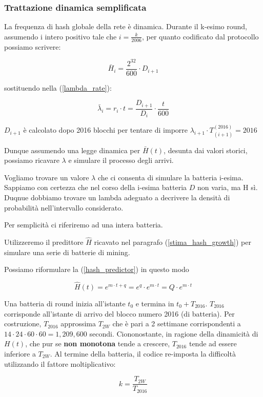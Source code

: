 \documentclass{book}
\theoremstyle{definition}
\begin{document}
\subsubsection{Trattazione dinamica semplificata}

La frequenza di hash globale della rete è dinamica.
Durante il k-esimo round, assumendo i intero positivo tale che $i = \frac{k}{2006}$, per quanto codificato dal protocollo possiamo scrivere:

$$
    \bar{H}_{i} = \frac{2^{32}}{600} \cdot D_{i+1}
$$

sostituendo nella (\ref{lambda_rate}):

$$
\bar{\lambda}_{i} = r_{i} \cdot t = \frac{D_{i+1}}{D_{i}} \cdot \frac{t}{600}
$$

$D_{i+1}$ è calcolato dopo 2016 blocchi per tentare di imporre $\lambda_{i+1} \cdot T_{(i+1)}^{(2016)}  = 2016$ 

Dunque assumendo una legge dinamica per $\bar{H}(t)$, desunta dai valori storici, possiamo ricavare $\lambda$ e simulare il processo degli arrivi.

Vogliamo trovare un valore $\lambda$ che ci consenta di simulare la batteria i-esima. Sappiamo con certezza che nel corso della i-esima batteria $D$ non varia, ma H sì. Duqnue dobbiamo trovare un lambda adeguato a decrivere la densità di probabilità nell'intervallo considerato.

Per semplicità ci riferiremo ad una intera batteria.

Utilizzeremo il predittore $\hat{H}$ ricavato nel paragrafo (\ref{stima_hash_growth}) per simulare una serie di batterie di mining.

Possiamo riformulare la (\ref{hash_predictor}) in questo modo

$$
	\hat{H}(t) = e^{m \cdot t + q} = e^{q} \cdot e^{m \cdot t} = Q \cdot e^{m \cdot t}
$$

Una batteria di round inizia all'istante $t_{0}$ e termina in $t_{0} + T_{2016}$. $T_{2016}$ corrisponde all'istante di arrivo del blocco numero 2016 (di batteria). Per costruzione, $T_{2016}$ approssima $T_{2W}$ che è pari a 2 settimane corrispondenti a $14 \cdot 24 \cdot 60 \cdot 60 = 1,209,600$ secondi. 
Ciononostante, in ragione della dinamicità di $H(t)$, che pur se \textbf{non monotona} tende a crescere, $T_{2016}$ tende ad essere inferiore a $T_{2W}$. Al termine della batteria, il codice re-imposta la difficoltà utilizzando il fattore moltiplicativo:

$$
    k = \frac{T_{2W}}{T_{2016}}
$$
\end{document}
